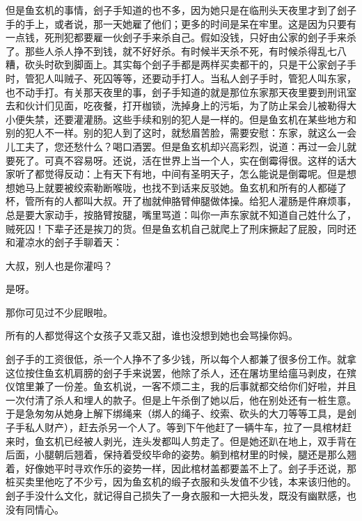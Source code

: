 但是鱼玄机的事情，刽子手知道的也不多，因为她只是在临刑头天夜里才到了刽子手的手上，或者说，那一天她雇了他们；更多的时间是呆在牢里。这是因为只要有一点钱，死刑犯都要雇一伙刽子手来杀自己。假如没钱，只好由公家的刽子手来杀了。那些人杀人挣不到钱，就不好好杀。有时候半天杀不死，有时候杀得乱七八糟，砍头时砍到脚面上。其实每个刽子手都是两样买卖都干的，只是干公家刽子手时，管犯人叫贼子、死囚等等，还要动手打人。当私人刽子手时，管犯人叫东家，也不动手打。有关那天夜里的事，刽子手知道的就是那位东家那天夜里要到刑讯室去和伙计们见面，吃夜餐，打开枷锁，洗掉身上的污垢，为了防止呆会儿被勒得大小便失禁，还要灌灌肠。这些手续和别的犯人是一样的。但是鱼玄机在某些地方和别的犯人不一样。别的犯人到了这时，就愁眉苦脸，需要安慰：东家，就这么一会儿工夫了，您还愁什么？喝口酒罢。但是鱼玄机却兴高彩烈，说道：再过一会儿就要死了。可真不容易呀。还说，活在世界上当一个人，实在倒霉得很。这样的话大家听了都觉得反动：上有天下有地，中间有圣明天子，怎么能说是倒霉呢。但是想想她马上就要被绞索勒断喉咙，也找不到话来反驳她。鱼玄机和所有的人都碰了杯，管所有的人都叫大叔。开了枷就伸胳臂伸腿做体操。给犯人灌肠是件麻烦事，总是要大家动手，按胳臂按腿，嘴里骂道：叫你一声东家就不知道自己姓什么了，贼死囚！下辈子还是挨刀的货。但是鱼玄机自己就爬上了刑床撅起了屁股，同时还和灌凉水的刽子手聊着天： 

大叔，别人也是你灌吗？ 

是呀。 

那你可见过不少屁眼啦。 

所有的人都觉得这个女孩子又乖又甜，谁也没想到她也会骂操你妈。 

刽子手的工资很低，杀一个人挣不了多少钱，所以每个人都兼了很多份工作。就拿这位按住鱼玄机肩膀的刽子手来说罢，他除了杀人，还在屠坊里给瘟马剥皮，在殡仪馆里兼了一份差。鱼玄机说，一客不烦二主，我的后事就都交给你们好啦，并且一次付清了杀人和埋人的款子。但是上午杀倒了她以后，他在别处还有一桩生意。于是急匆匆从她身上解下绑绳来（绑人的绳子、绞索、砍头的大刀等等工具，是刽子手私人财产），赶去杀另一个人了。等到下午他赶了一辆牛车，拉了一具棺材赶来时，鱼玄机已经被人剥光，连头发都叫人剪走了。但是她还趴在地上，双手背在后面，小腿朝后翘着，保持着受绞毕命的姿势。躺到棺材里的时候，腿还是那么翘着，好像她平时寻欢作乐的姿势一样，因此棺材盖都要盖不上了。刽子手还说，那桩买卖里他吃了不少亏，因为鱼玄机的缎子衣服和头发值不少钱，本来该归他的。刽子手没什么文化，就记得自己损失了一身衣服和一大把头发，既没有幽默感，也没有同情心。 

